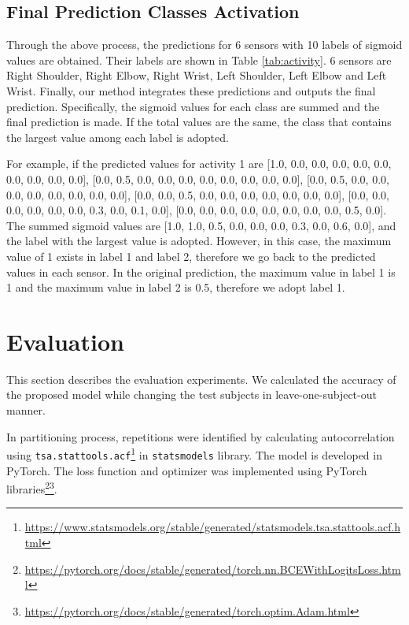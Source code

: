 \documentclass[graybox]{svmult}
\begin{document}
\subsection{Final Prediction Classes Activation}
Through the above process, the predictions for 6 sensors with 10 labels of sigmoid values are obtained. Their labels are shown in Table \ref{tab:activity}. 6 sensors are Right Shoulder, Right Elbow, Right Wrist, Left Shoulder, Left Elbow and Left Wrist. Finally, our method integrates these predictions and outputs the final prediction.
Specifically, the sigmoid values for each class are summed and the final prediction is made. If the total values are the same, the class that contains the largest value among each label is adopted.

For example, if the predicted values for activity 1 are [1.0, 0.0, 0.0, 0.0, 0.0, 0.0, 0.0, 0.0, 0.0, 0.0], [0.0, 0.5, 0.0, 0.0, 0.0, 0.0, 0.0, 0.0, 0.0, 0.0], [0.0, 0.5, 0.0, 0.0, 0.0, 0.0, 0.0, 0.0, 0.0, 0.0], [0.0, 0.0, 0.5, 0.0, 0.0, 0.0, 0.0, 0.0, 0.0, 0.0], [0.0, 0.0, 0.0, 0.0, 0.0, 0.0, 0.3, 0.0, 0.1, 0.0], [0.0, 0.0, 0.0, 0.0, 0.0, 0.0, 0.0, 0.0, 0.5, 0.0].
The summed sigmoid values are [1.0, 1.0, 0.5, 0.0, 0.0, 0.0, 0.3, 0.0, 0.6, 0.0], and the label with the largest value is adopted. However, in this case, the maximum value of 1 exists in label 1 and label 2, therefore we go back to the predicted values in each sensor. In the original prediction, the maximum value in label 1 is 1 and the maximum value in label 2 is 0.5, therefore we adopt label 1.



\section{Evaluation}
This section describes the evaluation experiments. We calculated the accuracy of the proposed model while changing the test subjects in leave-one-subject-out manner.\par

In partitioning process, repetitions were identified by calculating autocorrelation using \texttt{tsa.stattools.acf}\footnote{\url{https://www.statsmodels.org/stable/generated/statsmodels.tsa.stattools.acf.html}} in \texttt{statsmodels} library. The model is developed in PyTorch. The loss function and optimizer was implemented using PyTorch libraries\footnote{\url{https://pytorch.org/docs/stable/generated/torch.nn.BCEWithLogitsLoss.html}}\footnote{\url{https://pytorch.org/docs/stable/generated/torch.optim.Adam.html}}.\par
\end{document}
